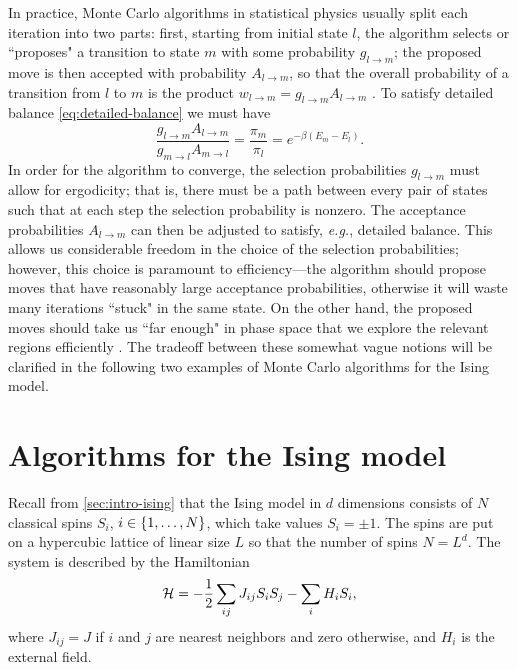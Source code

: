 In practice, Monte Carlo algorithms in statistical physics usually split each
iteration into two parts: first, starting from initial state $l$, the algorithm
selects or ``proposes" a transition to state $m$ with some probability
$g_{l \to m}$; the proposed move is then accepted with probability
$A_{l \to m}$, so that the overall probability of a transition from $l$ to $m$
is the product $w_{l \to m} = g_{l \to m} A_{l \to m}$
\autocite{newman1999monte}. To satisfy detailed balance
\eqref{eq:detailed-balance} we must have
\begin{equation}
  \frac{g_{l \to m} A_{l \to m}}{g_{m \to l} A_{m \to l}}
  = \frac{\pi_m}{\pi_l}
  = e^{-\beta(E_m - E_l)}.
  \label{eq:select-accept}
\end{equation}
In order for the algorithm to converge, the selection probabilities $g_{l \to
  m}$ must allow for ergodicity; that is, there must be a path between every
pair of states such that at each step the selection probability is nonzero. The
acceptance probabilities $A_{l \to m}$ can then be adjusted to satisfy,
\emph{e.g.}, detailed balance. This allows us considerable freedom in the
choice of the selection probabilities; however, this choice is paramount to
efficiency---the algorithm should propose moves that have reasonably large
acceptance probabilities, otherwise it will waste many iterations ``stuck" in
the same state. On the other hand, the proposed moves should take us ``far
enough" in phase space that we explore the relevant regions efficiently . The
tradeoff between these somewhat vague notions will be clarified in the
following two examples of Monte Carlo algorithms for the Ising model.


\section{Algorithms for the Ising model}

Recall from \cref{sec:intro-ising} that the Ising model in $d$ dimensions
consists of $N$ classical spins $S_i$, $i \in \cbr{1,\dots,N}$, which take
values $S_i = \pm 1$. The spins are put on a hypercubic lattice of linear size
$L$ so that the number of spins $N=L^d$. The system is described by the
Hamiltonian
\begin{equation}
  \mathcal{H} = -\frac{1}{2} \sum_{ij} J_{ij} S_i S_j - \sum_i H_i S_i,
\end{equation}
where $J_{ij}=J$ if $i$ and $j$ are nearest neighbors and zero otherwise, and
$H_i$ is the external field.


